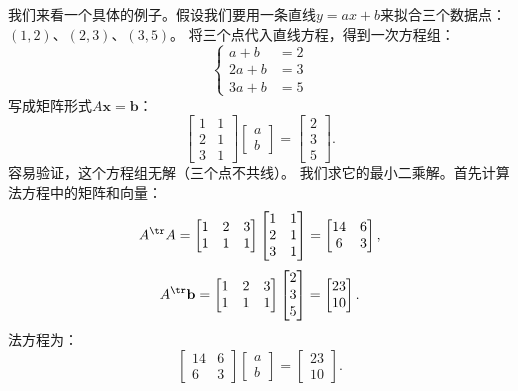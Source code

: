 \documentclass[12pt,UTF8,fontset=none]{ctexbook}
\begin{document}
我们来看一个具体的例子。假设我们要用一条直线$y = ax + b$来拟合三个数据点：
$(1, 2)$、$(2, 3)$、$(3, 5)$。
将三个点代入直线方程，得到一次方程组：
$$ \left\{
\begin{aligned}
a + b &= 2 \\
2a + b &= 3 \\
3a + b &= 5
\end{aligned}
\right. $$
写成矩阵形式$A\mathbf{x} = \mathbf{b}$：
$$ \begin{bmatrix} 1 & 1 \\ 2 & 1 \\ 3 & 1 \end{bmatrix} \begin{bmatrix} a \\ b \end{bmatrix} = \begin{bmatrix} 2 \\ 3 \\ 5 \end{bmatrix}. $$
容易验证，这个方程组无解（三个点不共线）。
我们求它的最小二乘解。首先计算法方程中的矩阵和向量：
$$ A^{\tr} A = \begin{bmatrix} 1 & 2 & 3 \\ 1 & 1 & 1 \end{bmatrix} \begin{bmatrix} 1 & 1 \\ 2 & 1 \\ 3 & 1 \end{bmatrix} = \begin{bmatrix} 14 & 6 \\ 6 & 3 \end{bmatrix}, $$
$$ A^{\tr} \mathbf{b} = \begin{bmatrix} 1 & 2 & 3 \\ 1 & 1 & 1 \end{bmatrix} \begin{bmatrix} 2 \\ 3 \\ 5 \end{bmatrix} = \begin{bmatrix} 23 \\ 10 \end{bmatrix}. $$
法方程为：
$$ \begin{bmatrix} 14 & 6 \\ 6 & 3 \end{bmatrix} \begin{bmatrix} a \\ b \end{bmatrix} = \begin{bmatrix} 23 \\ 10 \end{bmatrix}. $$
\end{document}
